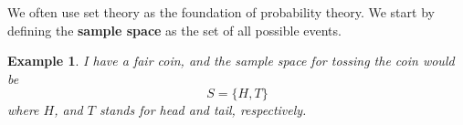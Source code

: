 \documentclass{article}
\newtheorem{ex}{Example}
\begin{document}
We often use set theory as the foundation of probability theory. We start by defining the \textbf{sample space} as the set of all possible events.
\begin{ex}
	I have a fair coin, and the sample space for tossing the coin would be
	\[ S = \{ H, T \} \]
	where $H$, and $T$ stands for head and tail, respectively.
\end{ex}
\end{document}
